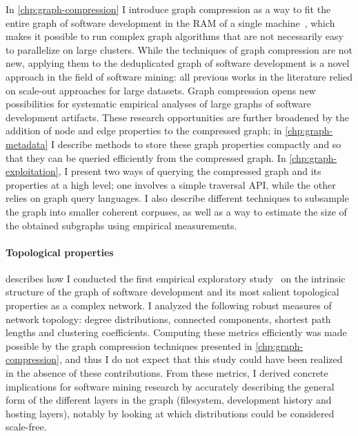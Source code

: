 In \cref{chp:graph-compression} I introduce graph compression as a way to
fit the entire graph of software development in the RAM of a single
machine~\cite{saner-2020-swh-graph}, which makes it possible to run complex
graph algorithms that are not necessarily easy to parallelize on large
clusters. While the techniques of graph compression are not new, applying them
to the deduplicated graph of software development is a novel approach in the
field of software mining: all previous works in the literature relied on
scale-out approaches for large datasets.  Graph compression opens new
possibilities for systematic empirical analyses of large graphs of software
development artifacts. These research opportunities are further broadened by
the addition of node and edge properties to the compressed graph; in
\cref{chp:graph-metadata} I describe methods to store these graph properties
compactly and so that they can be queried efficiently from the compressed
graph. In \cref{chp:graph-exploitation}, I present two ways of querying the
compressed graph and its properties at a high level; one involves a simple
traversal API, while the other relies on graph query languages. I also describe
different techniques to subsample the graph into smaller coherent corpuses, as
well as a way to estimate the size of the obtained subgraphs using empirical
measurements.

\paragraph*{Topological properties}

 describes how I conducted the first empirical exploratory
study~\cite{msr-2020-topology} on the intrinsic structure of the graph of
software development and its most salient topological properties as a complex
network. I analyzed the following robust measures of network topology: degree
distributions, connected components, shortest path lengths and clustering
coefficients.  Computing these metrics efficiently was made possible by the
graph compression techniques presented in \cref{chp:graph-compression}, and
thus I do not expect that this study could have been realized in the absence of
these contributions. From these metrics, I derived concrete implications for
software mining research by accurately describing the general form of the
different layers in the graph (filesystem, development history and hosting
layers), notably by looking at which distributions could be considered
scale-free.


